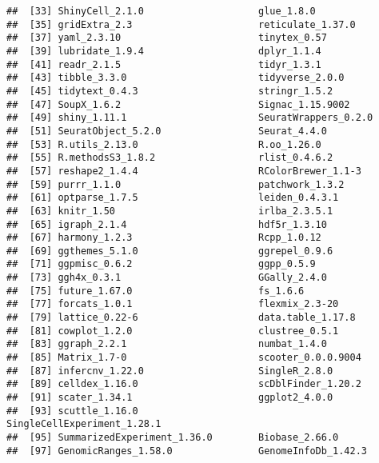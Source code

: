 \documentclass[
  11pt,
  a4paper,
]{article}
\begin{document}
\begin{verbatim}
##  [33] ShinyCell_2.1.0                    glue_1.8.0                        
##  [35] gridExtra_2.3                      reticulate_1.37.0                 
##  [37] yaml_2.3.10                        tinytex_0.57                      
##  [39] lubridate_1.9.4                    dplyr_1.1.4                       
##  [41] readr_2.1.5                        tidyr_1.3.1                       
##  [43] tibble_3.3.0                       tidyverse_2.0.0                   
##  [45] tidytext_0.4.3                     stringr_1.5.2                     
##  [47] SoupX_1.6.2                        Signac_1.15.9002                  
##  [49] shiny_1.11.1                       SeuratWrappers_0.2.0              
##  [51] SeuratObject_5.2.0                 Seurat_4.4.0                      
##  [53] R.utils_2.13.0                     R.oo_1.26.0                       
##  [55] R.methodsS3_1.8.2                  rlist_0.4.6.2                     
##  [57] reshape2_1.4.4                     RColorBrewer_1.1-3                
##  [59] purrr_1.1.0                        patchwork_1.3.2                   
##  [61] optparse_1.7.5                     leiden_0.4.3.1                    
##  [63] knitr_1.50                         irlba_2.3.5.1                     
##  [65] igraph_2.1.4                       hdf5r_1.3.10                      
##  [67] harmony_1.2.3                      Rcpp_1.0.12                       
##  [69] ggthemes_5.1.0                     ggrepel_0.9.6                     
##  [71] ggpmisc_0.6.2                      ggpp_0.5.9                        
##  [73] ggh4x_0.3.1                        GGally_2.4.0                      
##  [75] future_1.67.0                      fs_1.6.6                          
##  [77] forcats_1.0.1                      flexmix_2.3-20                    
##  [79] lattice_0.22-6                     data.table_1.17.8                 
##  [81] cowplot_1.2.0                      clustree_0.5.1                    
##  [83] ggraph_2.2.1                       numbat_1.4.0                      
##  [85] Matrix_1.7-0                       scooter_0.0.0.9004                
##  [87] infercnv_1.22.0                    SingleR_2.8.0                     
##  [89] celldex_1.16.0                     scDblFinder_1.20.2                
##  [91] scater_1.34.1                      ggplot2_4.0.0                     
##  [93] scuttle_1.16.0                     SingleCellExperiment_1.28.1       
##  [95] SummarizedExperiment_1.36.0        Biobase_2.66.0                    
##  [97] GenomicRanges_1.58.0               GenomeInfoDb_1.42.3               

\end{verbatim}
\end{document}
